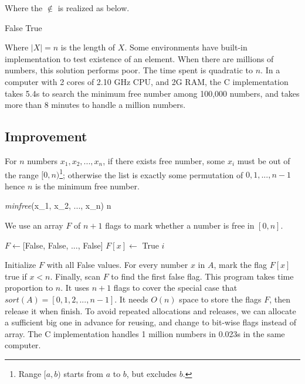 \documentclass[b5paper]{article}
\begin{document}
Where the $\notin$ is realized as below.

\begin{algorithmic}[1]
      \State \Return False
    \EndIf
  \EndFor
  \State \Return True
\EndFunction
\end{algorithmic}

Where $|X| = n$ is the length of $X$. Some environments have built-in implementation to test existence of an element. When there are millions of numbers, this solution performs poor. The time spent is quadratic to $n$. In a computer with 2 cores of 2.10 GHz CPU, and 2G RAM, the C implementation takes 5.4s to search the minimum free number among 100,000 numbers, and takes more than 8 minutes to handle a million numbers.

\subsection*{Improvement}
For $n$ numbers $x_1, x_2, ..., x_n$, if there exists free number, some $x_i$ must be out of the range $[0, n)$\footnote{Range $[a, b)$ starts from $a$ to $b$, but excludes $b$.}; otherwise the list is exactly some permutation of $0, 1, ..., n - 1$ hence $n$ is the minimum free number.

\be
\textit{minfree}(x_1, x_2, ..., x_n) \leq n
\label{eq:min-free}
\ee

We use an array $F$ of $n + 1$ flags to mark whether a number is free in $[0, n]$.

\begin{algorithmic}[1]
  \State $F \gets $[False, False, ..., False] 
      \State $F[x] \gets$ True
    \EndIf
  \EndFor
      \State \Return $i$
    \EndIf
  \EndFor
\EndFunction
\end{algorithmic}

Initialize $F$ with all False values. For every number $x$ in $A$, mark the flag $F[x]$ true if $x < n$. Finally, scan $F$ to find the first false flag. This program takes time proportion to $n$. It uses $n + 1$ flags to cover the special case that $sort(A) = [0, 1, 2, ..., n-1]$. It needs $O(n)$ space to store the flags $F$, then release it when finish. To avoid repeated allocations and releases, we can allocate a sufficient big one in advance for reusing, and change to bit-wise flags instead of array. The C implementation handles 1 million numbers in 0.023s in the same computer.
\end{document}
